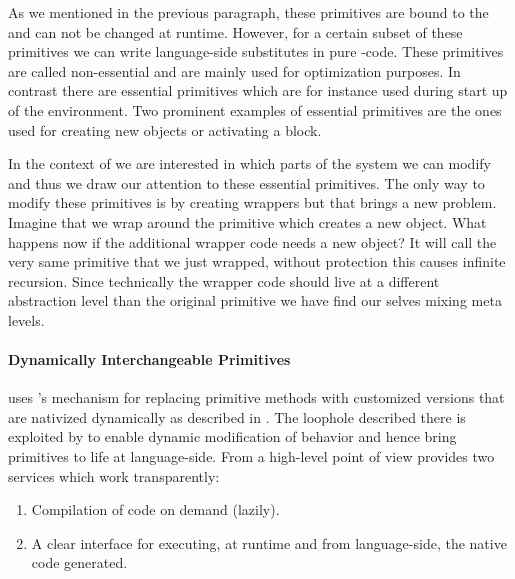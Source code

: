 As we mentioned in the previous paragraph, these primitives are bound to the \VM and can not be changed at runtime.
However, for a certain subset of these primitives we can write language-side substitutes in pure \PH-code.
These primitives are called non-essential and are mainly used for optimization purposes. 
In contrast there are essential primitives which are for instance used during start up of the \PH environment.
Two prominent examples of essential primitives are the ones used for creating new objects or activating a block.

In the context of \WF we are interested in which parts of the system we can modify and thus we draw our attention to these essential primitives.
The only way to modify these primitives is by creating wrappers but that brings a new problem.
Imagine that we wrap around the primitive which creates a new object.
What happens now if the additional wrapper code needs a new object?
It will call the very same primitive that we just wrapped, without protection this causes infinite recursion.
Since technically the wrapper code should live at a different abstraction level than the original primitive we have find our selves mixing meta levels.


\paragraph{Dynamically Interchangeable Primitives}
\WF uses \B's mechanism for replacing primitive methods with customized versions that are nativized dynamically as described in .
The loophole described there is exploited by \WF to enable dynamic modification of \VM behavior and hence bring primitives to life at language-side.
From a high-level point of view \WF provides two services which work transparently: 

\begin{enumerate}
	\item Compilation of \Slang code on demand (lazily).
	\item A clear interface for executing, at runtime and from language-side, the native code generated.
\end{enumerate}

